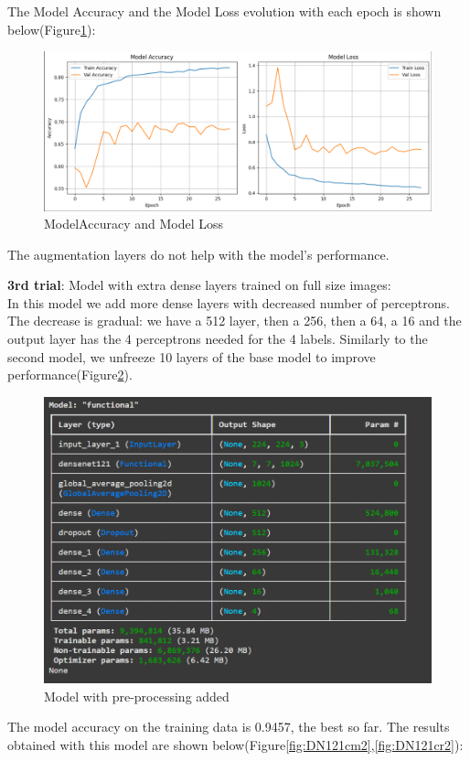 \documentclass{article}
\begin{document}
The Model Accuracy and the Model Loss evolution with each epoch is shown below(Figure\ref{fig:DN121graph1}):

\begin{figure}[H]
    \centering
    \includegraphics[width=0.8\linewidth]{DN121graph1.png}
    \caption{ModelAccuracy and Model Loss}
    \label{fig:DN121graph1}
\end{figure}

The augmentation layers do not help with the model's performance.

\textbf{3rd trial}: Model with extra dense layers trained on full size images:\\
In this model we add more dense layers with decreased number of perceptrons. The decrease is gradual: we have a 512 layer, then a 256, then a 64, a 16 and the output layer has the 4 perceptrons needed for the 4 labels. 
Similarly to the second model, we unfreeze 10 layers of the base model to improve performance(Figure\ref{fig:DN121arch2}).

\begin{figure}[H]
    \centering
    \includegraphics[width=0.6\linewidth]{DN121arch2.png}
    \caption{Model with pre-processing added}
    \label{fig:DN121arch2}
\end{figure}

The model accuracy on the training data is 0.9457, the best so far. The results obtained with this model are shown below(Figure\ref{fig:DN121cm2},\ref{fig:DN121cr2}):
\end{document}
